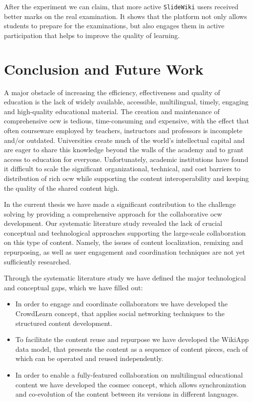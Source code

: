 \documentclass[PhD, Submit, ngerman,UKenglish,table]{scrbook}
\begin{document}
After the experiment we can claim, that more active \texttt{SlideWiki} users received better marks on the real examination.
It shows that the platform not only allows students to prepare for the examinations, but also engages them in active participation that helps to improve the quality of learning.



\chapter{Conclusion and Future Work}
\label{chapter:conclusion}

A major obstacle of increasing the efficiency, effectiveness and quality of education is the lack of widely available, accessible, multilingual, timely, engaging and high-quality educational material.
The creation and maintenance of comprehensive \gls{ocw} is tedious, time-consuming and expensive, with the effect that often courseware employed by teachers, instructors and professors is incomplete and/or outdated.
Universities create much of the world's intellectual capital and are eager to share this knowledge beyond the walls of the academy and to grant access to education for everyone.
Unfortunately, academic institutions have found it difficult to scale the significant organizational, technical, and cost barriers to distribution of rich \gls{ocw} while supporting the content interoperability and keeping the quality of the shared content high.

In the current thesis we have made a significant contribution to the challenge solving by providing a comprehensive approach for the collaborative \gls{ocw} development.
Our systematic literature study revealed the lack of crucial conceptual and technological approaches supporting the large-scale collaboration on this type of content.
Namely, the issues of content localization, remixing and repurposing, as well as user engagement and coordination techniques are not yet sufficiently researched.

Through the systematic literature study we have defined the major technological and conceptual gaps, which we have filled out:
\begin{itemize}
\item In order to engage and coordinate collaborators we have developed the CrowdLearn concept, that applies social networking techniques to the structured content development.
\item To facilitate the content reuse and repurpose we have developed the WikiApp data model, that presents the content as a sequence of content pieces, each of which can be operated and reused independently.
\item In order to enable a fully-featured collaboration on multilingual educational content we have developed the \gls{cosmec} concept, which allows synchronization and co-evolution of the content between its versions in different languages.
\end{itemize}
\end{document}
